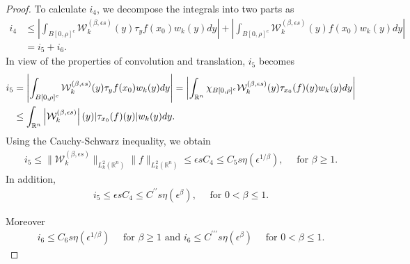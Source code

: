 \documentclass[10pt,a4paper]{amsart}
\begin{document}
\begin{proof}
To calculate $i_4$, we decompose the integrals into two parts as
\begin{align*}
    i_4 &\leq \left|\int_{B[0,\rho]^c} \mathcal{W}_k^{(\beta, \epsilon s)}(y)  \tau_yf(x_0) w_k(y)dy
        \right| + \left|\int_{B[0,\rho]^c} \mathcal{W}_k^{(\beta, \epsilon s)}(y)  f(x_0) w_k(y)dy 
        \right| \\
        &= i_5+i_6.
\end{align*}
In view of the properties of convolution and translation, $i_5$ becomes
\begin{align*}
    i_5 &= \left|\int_{B[0,\rho]^c} \mathcal{W}_k^{(\beta, \epsilon s)}(y)  \tau_yf(x_0) w_k(y)dy
        \right| = \left| \int_{\mathbb{R}^n} \chi_{B[0,\rho]^c} \mathcal{W}_k^{(\beta, \epsilon s)}(y)\tau_{x_0}( f)(y)w_k(y)dy \right| \notag \\
        & \leq  \int_{\mathbb{R}^n} \left| \mathcal{W}_k^{(\beta, \epsilon s)}\right|(y)|\tau_{x_0}(f)(y)|w_k(y)dy. \notag
\end{align*} 
Using the Cauchy-Schwarz inequality, we obtain  
\begin{align*}
    i_5 \leq  \|\mathcal{W}_k^{(\beta, \epsilon s)}\|_{L_k^2(\mathbb{R}^n)} \|f\|_{L_k^2(\mathbb{R}^n)} \leq \epsilon s C_4 \leq C_5 s\eta(\epsilon^{1/\beta}), \quad \text{ for }  \beta \geq 1. %
\end{align*}
In addition, 
\begin{align*}%
    i_5 \leq \epsilon s C_4 \leq C^{\prime\prime} s\eta(\epsilon^{\beta}), \quad \text{ for } 0< \beta \leq 1.
\end{align*}

\noindent Moreover 
\begin{align*}
    i_6 \leq C_6 s\eta(\epsilon^{1/\beta}) \quad \text{ for $\beta \geq 1$  and } i_6 \leq C^{\prime\prime\prime} s\eta(\epsilon^{\beta}) \quad \text{ for $0<\beta \leq 1$.}
\end{align*}


\end{proof}
\end{document}
